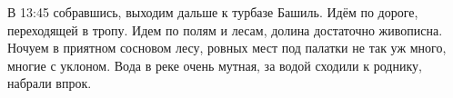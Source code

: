 В 13:45 собравшись, выходим дальше к турбазе Башиль. Идём по дороге, переходящей в тропу. Идем по полям и лесам, долина достаточно живописна. Ночуем в приятном сосновом лесу, ровных мест под палатки не так уж много, многие с уклоном. Вода в реке очень мутная, за водой сходили к роднику, набрали впрок.














    \FloatBarrier
